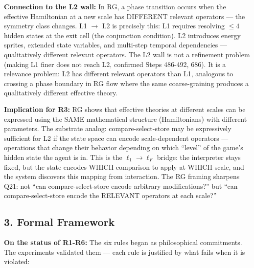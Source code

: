 \documentclass[
  11pt,
]{article}
\begin{document}
\textbf{Connection to the L2 wall:} In RG, a phase transition occurs
when the effective Hamiltonian at a new scale has DIFFERENT relevant
operators --- the symmetry class changes. L1 \(\to\) L2 is precisely
this: L1 requires resolving \(\leq 4\) hidden states at the exit cell
(the conjunction condition). L2 introduces energy sprites, extended
state variables, and multi-step temporal dependencies --- qualitatively
different relevant operators. The L2 wall is not a refinement problem
(making L1 finer does not reach L2, confirmed Steps 486-492, 686). It is
a relevance problem: L2 has different relevant operators than L1,
analogous to crossing a phase boundary in RG flow where the same
coarse-graining produces a qualitatively different effective theory.

\textbf{Implication for R3:} RG shows that effective theories at
different scales can be expressed using the SAME mathematical structure
(Hamiltonians) with different parameters. The substrate analog:
compare-select-store may be expressively sufficient for L2 if the state
space can encode scale-dependent operators --- operations that change
their behavior depending on which ``level'' of the game's hidden state
the agent is in. This is the \(\ell_1 \to \ell_F\) bridge: the
interpreter stays fixed, but the state encodes WHICH comparison to apply
at WHICH scale, and the system discovers this mapping from interaction.
The RG framing sharpens Q21: not ``can compare-select-store encode
arbitrary modifications?'' but ``can compare-select-store encode the
RELEVANT operators at each scale?''

\subsection{3. Formal Framework}\label{formal-framework}

\textbf{On the status of R1-R6:} The six rules began as philosophical
commitments. The experiments validated them --- each rule is justified
by what fails when it is violated:
\end{document}

